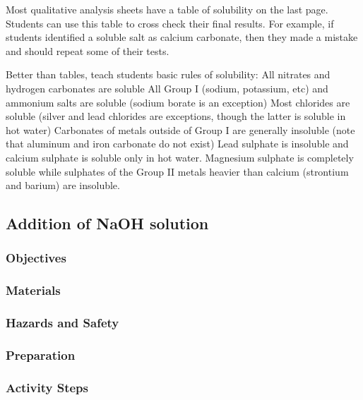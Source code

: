 Most qualitative analysis sheets have a table of solubility on the last page. 
Students can use this table to cross check their final results. 
For example, 
if students identified a soluble salt as calcium carbonate, 
then they made a mistake and should repeat some of their tests.

Better than tables, 
teach students basic rules of solubility:
All nitrates and hydrogen carbonates are soluble
All Group I (sodium, 
potassium, 
etc) and ammonium salts are soluble (sodium borate is an exception)
Most chlorides are soluble (silver and lead chlorides are exceptions, 
though the latter is soluble in hot water)
Carbonates of metals outside of Group I are generally insoluble 
(note that aluminum and iron carbonate do not exist)
Lead sulphate is insoluble and calcium sulphate is soluble only in hot water. 
Magnesium sulphate is completely soluble 
while sulphates of the Group II metals heavier than calcium 
(strontium and barium) are insoluble.

\subsection{Addition of NaOH solution}

\subsubsection{Objectives}


\subsubsection{Materials}


\subsubsection{Hazards and Safety}


\subsubsection{Preparation}
\begin{enumerate}
\end{enumerate}

\subsubsection{Activity Steps}
\begin{enumerate}
\end{enumerate}

